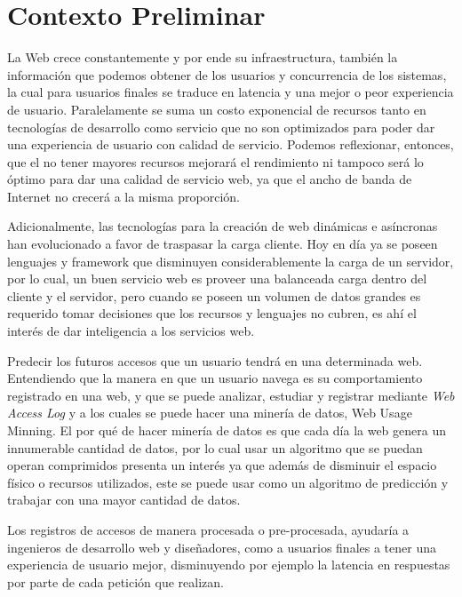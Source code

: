 \section{Contexto Preliminar} \label{sec:preliminar}


  La Web crece constantemente y por ende su infraestructura, también la información que podemos obtener de los  usuarios y  concurrencia de los sistemas, la cual para usuarios finales se traduce en latencia y una mejor o peor experiencia de usuario. Paralelamente se suma un costo exponencial de recursos tanto en tecnologías de desarrollo como servicio que no son optimizados para poder dar una experiencia de usuario con calidad de servicio. Podemos reflexionar, entonces, que el no tener mayores recursos mejorará el rendimiento ni tampoco será lo óptimo para dar una calidad de servicio web, ya que el ancho de banda de Internet no crecerá a la misma proporción.
   
  Adicionalmente, las tecnologías para la creación de web dinámicas e asíncronas han evolucionado a favor de traspasar la carga cliente.
  Hoy en día ya se poseen lenguajes y framework que disminuyen considerablemente la carga de un servidor, por lo cual, un buen servicio web es proveer una balanceada carga dentro del cliente y el servidor, pero cuando se poseen un volumen de datos grandes es requerido tomar decisiones que los recursos y lenguajes no cubren, es ahí el interés de dar inteligencia a los servicios web.

  Predecir los futuros accesos que un usuario tendrá en una determinada web. Entendiendo que la manera en que un usuario navega es su comportamiento registrado en una web, y que se puede analizar, estudiar y registrar mediante \emph{Web Access Log} y a los cuales se puede hacer una minería de datos, Web Usage Minning. El por qué de hacer minería de datos es que cada día la web genera un innumerable cantidad de datos, por lo cual usar un algoritmo que se puedan operan comprimidos presenta un interés ya que además de disminuir el espacio físico o recursos utilizados, este se puede usar como un algoritmo de predicción y trabajar con una mayor cantidad de datos.
  
  Los registros de accesos de manera procesada o pre-procesada, ayudaría a ingenieros de desarrollo web y diseñadores, como a  usuarios finales a tener una experiencia de usuario mejor, disminuyendo por ejemplo la latencia en respuestas por parte de cada petición que realizan.
  

